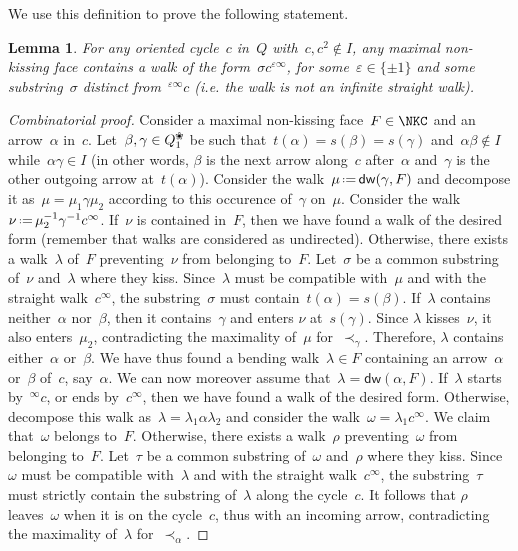 \documentclass{amsart}
\newtheorem{lemma}[theorem]{Lemma}
\theoremstyle{definition}
\newcommand{\eqdef}{\mbox{\,\raisebox{0.2ex}{\scriptsize\ensuremath{\mathrm:}}\ensuremath{=}\,}} %
\newcommand{\blossom}{^\text{\ding{96}}} %
\newcommand{\distinguishedWalk}[2]{\mathsf{dw}(#1,#2)} %
\begin{document}
We use this definition to prove the following statement.

\begin{lemma}
\label{lem:walksThroughcycles}
For any oriented cycle~$c$ in~$Q$ with~$c, c^2\notin I$, any maximal non-kissing face contains a walk of the form~$\sigma c^{\varepsilon\infty}$, for some~$\varepsilon\in\{\pm1\}$ and some substring~$\sigma$ distinct from~$^{\varepsilon\infty}c$ (i.e. the walk is not an infinite straight walk).
\end{lemma}

\begin{proof}[Combinatorial proof]
Consider a maximal non-kissing face~$F \in \NKC$ and an arrow~$\alpha$ in~$c$.
Let~$\beta, \gamma \in Q_1\blossom$ be such that~$t(\alpha) = s(\beta) = s(\gamma)$ and~$\alpha\beta \notin I$ while~$\alpha\gamma \in I$ (in other words, $\beta$ is the next arrow along~$c$ after~$\alpha$ and~$\gamma$ is the other outgoing arrow at~$t(\alpha)$).
Consider the walk~$\mu \eqdef \distinguishedWalk{\gamma}{F}$ and decompose it as~$\mu = \mu_1 \gamma \mu_2$ according to this occurence of~$\gamma$ on~$\mu$.
Consider the walk~$\nu \eqdef \mu_2^{-1} \gamma^{-1} c^\infty$.
If~$\nu$ is contained in~$F$, then we have found a walk of the desired form (remember that walks are considered as undirected).
Otherwise, there exists a walk~$\lambda$ of~$F$ preventing~$\nu$ from belonging to~$F$.
Let~$\sigma$ be a common substring of~$\nu$ and~$\lambda$ where they kiss.
Since~$\lambda$ must be compatible with~$\mu$ and with the straight walk~$c^\infty$, the substring~$\sigma$ must contain~${t(\alpha) = s(\beta)}$.
If~$\lambda$ contains neither~$\alpha$ nor~$\beta$, then it contains~$\gamma$ and enters $\nu$ at~$s(\gamma)$.
Since $\lambda$ kisses~$\nu$, it also enters~$\mu_2$, contradicting the maximality of~$\mu$ for~$\prec_\gamma$.
Therefore, $\lambda$ contains either~$\alpha$ or~$\beta$.
We have thus found a bending walk~$\lambda \in F$ containing an arrow~$\alpha$ or~$\beta$ of~$c$, say~$\alpha$.
We can now moreover assume that~$\lambda = \distinguishedWalk{\alpha}{F}$.
If~$\lambda$ starts by~$^\infty c$, or ends by~$c^\infty$, then we have found a walk of the desired form.
Otherwise, decompose this walk as~$\lambda = \lambda_1 \alpha \lambda_2$ and consider the walk~$\omega = \lambda_1 c^\infty$.
We claim that~$\omega$ belongs to~$F$.
Otherwise, there exists a walk~$\rho$ preventing~$\omega$ from belonging to~$F$.
Let~$\tau$ be a common substring of~$\omega$ and~$\rho$ where they kiss.
Since~$\omega$ must be compatible with~$\lambda$ and with the straight walk~$c^\infty$, the substring~$\tau$ must strictly contain the substring of~$\lambda$ along the cycle~$c$.
It follows that $\rho$ leaves~$\omega$ when it is on the cycle~$c$, thus with an incoming arrow, contradicting the maximality of~$\lambda$ for~$\prec_\alpha$.


\end{proof}
\end{document}
